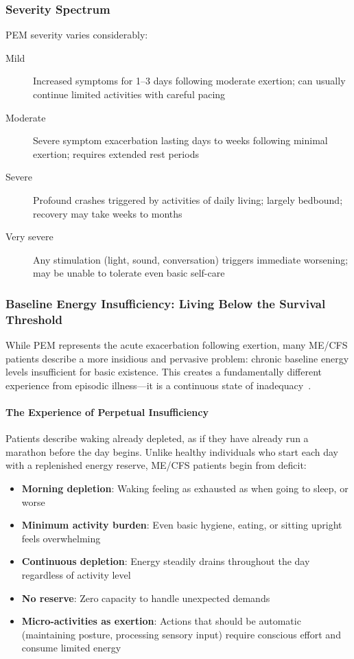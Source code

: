 \subsubsection{Severity Spectrum}

PEM severity varies considerably:

\begin{description}
    \item[Mild] Increased symptoms for 1--3 days following moderate exertion; can usually continue limited activities with careful pacing
    \item[Moderate] Severe symptom exacerbation lasting days to weeks following minimal exertion; requires extended rest periods
    \item[Severe] Profound crashes triggered by activities of daily living; largely bedbound; recovery may take weeks to months
    \item[Very severe] Any stimulation (light, sound, conversation) triggers immediate worsening; may be unable to tolerate even basic self-care
\end{description}

\subsubsection{Baseline Energy Insufficiency: Living Below the Survival Threshold}

While PEM represents the acute exacerbation following exertion, many ME/CFS patients describe a more insidious and pervasive problem: chronic baseline energy levels insufficient for basic existence. This creates a fundamentally different experience from episodic illness---it is a continuous state of inadequacy~\cite{strassheim2021experiences}.

\paragraph{The Experience of Perpetual Insufficiency}

Patients describe waking already depleted, as if they have already run a marathon before the day begins. Unlike healthy individuals who start each day with a replenished energy reserve, ME/CFS patients begin from deficit:

\begin{itemize}
    \item \textbf{Morning depletion}: Waking feeling as exhausted as when going to sleep, or worse
    \item \textbf{Minimum activity burden}: Even basic hygiene, eating, or sitting upright feels overwhelming
    \item \textbf{Continuous depletion}: Energy steadily drains throughout the day regardless of activity level
    \item \textbf{No reserve}: Zero capacity to handle unexpected demands
    \item \textbf{Micro-activities as exertion}: Actions that should be automatic (maintaining posture, processing sensory input) require conscious effort and consume limited energy
\end{itemize}

